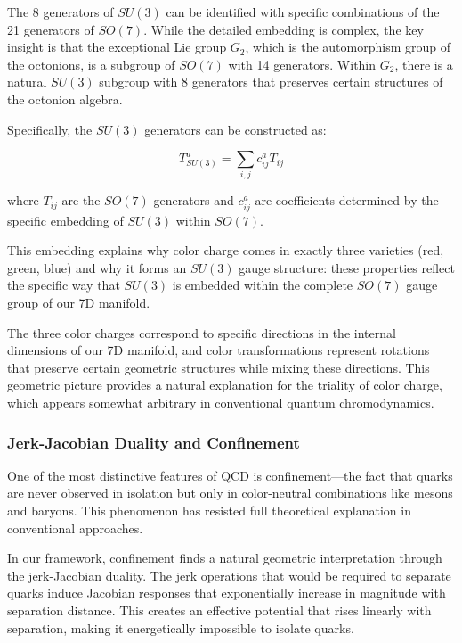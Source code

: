 \documentclass{article}
\begin{document}
The 8 generators of $SU(3)$ can be identified with specific combinations of the 21 generators of $SO(7)$. While the detailed embedding is complex, the key insight is that the exceptional Lie group $G_2$, which is the automorphism group of the octonions, is a subgroup of $SO(7)$ with 14 generators. Within $G_2$, there is a natural $SU(3)$ subgroup with 8 generators that preserves certain structures of the octonion algebra.

Specifically, the $SU(3)$ generators can be constructed as:

\begin{equation}
T^a_{SU(3)} = \sum_{i,j} c^a_{ij} T_{ij}
\end{equation}

where $T_{ij}$ are the $SO(7)$ generators and $c^a_{ij}$ are coefficients determined by the specific embedding of $SU(3)$ within $SO(7)$.

This embedding explains why color charge comes in exactly three varieties (red, green, blue) and why it forms an $SU(3)$ gauge structure: these properties reflect the specific way that $SU(3)$ is embedded within the complete $SO(7)$ gauge group of our 7D manifold.

The three color charges correspond to specific directions in the internal dimensions of our 7D manifold, and color transformations represent rotations that preserve certain geometric structures while mixing these directions. This geometric picture provides a natural explanation for the triality of color charge, which appears somewhat arbitrary in conventional quantum chromodynamics.

\subsubsection{Jerk-Jacobian Duality and Confinement}

One of the most distinctive features of QCD is confinement—the fact that quarks are never observed in isolation but only in color-neutral combinations like mesons and baryons. This phenomenon has resisted full theoretical explanation in conventional approaches.

In our framework, confinement finds a natural geometric interpretation through the jerk-Jacobian duality. The jerk operations that would be required to separate quarks induce Jacobian responses that exponentially increase in magnitude with separation distance. This creates an effective potential that rises linearly with separation, making it energetically impossible to isolate quarks.
\end{document}
